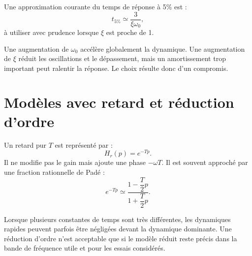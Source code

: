 Une approximation courante du temps de réponse à 5\% est :
\[
t_{5\%}\simeq\frac{3}{\xi\omega_0},
\]
à utiliser avec prudence lorsque $\xi$ est proche de 1.

\begin{SAapplication}[title={Lecture physique des paramètres}]
Une augmentation de $\omega_0$ accélère globalement la dynamique. Une augmentation de $\xi$ réduit les oscillations et le dépassement, mais un amortissement trop important peut ralentir la réponse. Le choix résulte donc d'un compromis.
\end{SAapplication}

\section{Modèles avec retard et réduction d'ordre}\label{sec:sa-retard-reduction}

Un retard pur $T$ est représenté par :
\[
H_r(p)=e^{-Tp}.
\]
Il ne modifie pas le gain mais ajoute une phase $-\omega T$. Il est souvent approché par une fraction rationnelle de Padé :
\[
e^{-Tp}\simeq\frac{1-\dfrac{T}{2}p}{1+\dfrac{T}{2}p}.
\]

Lorsque plusieurs constantes de temps sont très différentes, les dynamiques rapides peuvent parfois être négligées devant la dynamique dominante. Une réduction d'ordre n'est acceptable que si le modèle réduit reste précis dans la bande de fréquence utile et pour les essais considérés.
